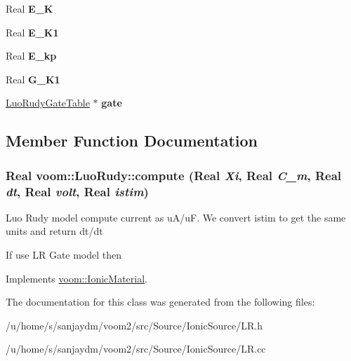 \begin{DoxyCompactItemize}
\item 
\hypertarget{classvoom_1_1_luo_rudy_a1714aa5e2bab1022c1de022d8c776217}{
Real {\bfseries E\_\-K}}
\label{classvoom_1_1_luo_rudy_a1714aa5e2bab1022c1de022d8c776217}

\item 
\hypertarget{classvoom_1_1_luo_rudy_ab3d362f1f10fda458f29a163690c966e}{
Real {\bfseries E\_\-K1}}
\label{classvoom_1_1_luo_rudy_ab3d362f1f10fda458f29a163690c966e}

\item 
\hypertarget{classvoom_1_1_luo_rudy_a9886c66b06535e6363d5b02de6a0fa36}{
Real {\bfseries E\_\-kp}}
\label{classvoom_1_1_luo_rudy_a9886c66b06535e6363d5b02de6a0fa36}

\item 
\hypertarget{classvoom_1_1_luo_rudy_a2b431b18716682153eac9138badcae71}{
Real {\bfseries G\_\-K1}}
\label{classvoom_1_1_luo_rudy_a2b431b18716682153eac9138badcae71}

\item 
\hypertarget{classvoom_1_1_luo_rudy_a6bd41f999aa8deec3aa212b5850690ea}{
\hyperlink{class_luo_rudy_gate_table}{LuoRudyGateTable} $\ast$ {\bfseries gate}}
\label{classvoom_1_1_luo_rudy_a6bd41f999aa8deec3aa212b5850690ea}

\end{DoxyCompactItemize}


\subsection{Member Function Documentation}
\hypertarget{classvoom_1_1_luo_rudy_a183e2b1a92b358944679f9e07e38c4be}{
\subsubsection[{compute}]{\setlength{\rightskip}{0pt plus 5cm}Real voom::LuoRudy::compute (Real {\em Xi}, \/  Real {\em C\_\-m}, \/  Real {\em dt}, \/  Real {\em volt}, \/  Real {\em istim})}}
\label{classvoom_1_1_luo_rudy_a183e2b1a92b358944679f9e07e38c4be}
Luo Rudy model compute current as uA/uF. We convert istim to get the same units and return dt/dt 

If use LR Gate model then 

Implements \hyperlink{classvoom_1_1_ionic_material_a1b95cf90af115374b428f2e5ece571cb}{voom::IonicMaterial}.

The documentation for this class was generated from the following files:\begin{DoxyCompactItemize}
\item 
/u/home/s/sanjaydm/voom2/src/Source/IonicSource/LR.h\item 
/u/home/s/sanjaydm/voom2/src/Source/IonicSource/LR.cc\end{DoxyCompactItemize}
